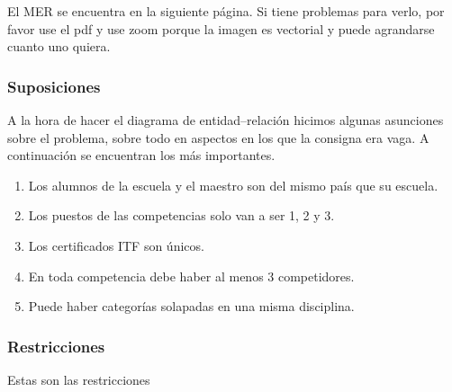 
El MER se encuentra en la siguiente página. Si tiene problemas para verlo, por favor use el pdf y use zoom porque la imagen es vectorial y puede agrandarse cuanto uno quiera.

\subsubsection{Suposiciones}

A la hora de hacer el diagrama de entidad--relación hicimos algunas asunciones sobre el problema, sobre todo en aspectos en los que la consigna era vaga. A continuación se encuentran los más importantes.

\begin{enumerate}
	\item Los alumnos de la escuela y el maestro son del mismo país que su escuela.
	\item Los puestos de las competencias solo van a ser 1, 2 y 3.
	\item Los certificados ITF son únicos.
	\item En toda competencia debe haber al menos 3 competidores.
	\item Puede haber categorías solapadas en una misma disciplina.
\end{enumerate}


\subsubsection{Restricciones}

Estas son las restricciones

